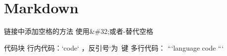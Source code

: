 \chapter{Markdown}

链接中添加空格的方法
使用\&\#32;或者-替代空格

代码块
行内代码：`code` ，反引号`为~键
多行代码：
```language
code
```
